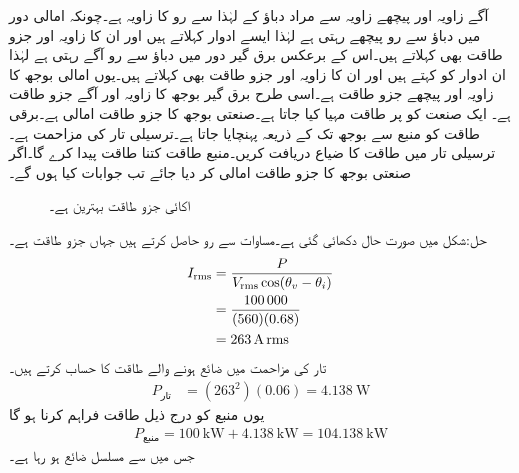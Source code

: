 آگے زاویہ اور پیچھے زاویہ سے مراد دباؤ کے لہٰذا سے رو کا زاویہ ہے۔چونکہ امالی دور میں دباؤ سے رو پیچھے رہتی ہے لہٰذا ایسے ادوار  کہلاتے ہیں اور ان کا زاویہ اور جزو طاقت بھی  کہلاتے ہیں۔اس کے برعکس برق گیر دور میں دباؤ سے رو آگے رہتی ہے لہٰذا ان ادوار کو  کہتے ہیں اور ان کا زاویہ اور جزو طاقت بھی  کہلاتے ہیں۔یوں امالی بوجھ  کا زاویہ   اور پیچھے جزو طاقت  ہے۔اسی طرح برق گیر بوجھ  کا زاویہ  اور آگے جزو طاقت  ہے۔
ایک صنعت کو  پر  طاقت مہیا کیا جاتا ہے۔صنعتی بوجھ کا جزو طاقت  امالی ہے۔برقی طاقت کو منبع سے بوجھ تک  کے ذریعہ پہنچایا جاتا ہے۔ترسیلی تار کی مزاحمت  ہے۔ترسیلی تار میں طاقت کا ضیاع دریافت کریں۔منبع طاقت کتنا طاقت پیدا کرے گا۔اگر صنعتی بوجھ کا جزو طاقت  امالی کر دیا جائے تب جوابات کیا ہوں گے۔
\begin{figure}
\centering
{}
\caption{اکائی جزو طاقت بہترین ہے۔}
\label{شکل_طاقت_جزو_طاقت_کے_اثرات}
\end{figure}

حل:شکل  میں صورت حال دکھائی گئی ہے۔مساوات  سے رو حاصل کرتے ہیں جہاں  جزو طاقت ہے۔
\begin{align*}
{\ensuremath{I_{\textup{rms}}}}&=\frac{P}{{V_{\textup{rms}}} \cos(\theta_v-\theta_i)}\\
&=\frac{\num{100000}}{(560)(0.68)}\\
&=\SI{263}{\ampere}\,{\textup{rms}}
\end{align*}
تار کی مزاحمت میں ضائع ہونے والے طاقت کا حساب کرتے ہیں۔
\begin{align*}
P_{\text{تار}}&=(263^2)(0.06)=\SI{4.138}{\watt}
\end{align*}
یوں منبع کو درج ذیل طاقت فراہم کرنا ہو گا
\begin{align*}
P_{\text{منبع}}=\SI{100}{\kilo\watt}+\SI{4.138}{\kilo\watt}=\SI{104.138}{\kilo\watt}
\end{align*} 
جس میں سے  مسلسل ضائع ہو رہا ہے۔

